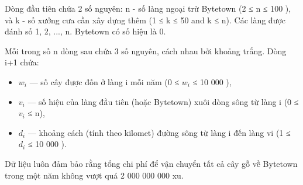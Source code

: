 Dòng đầu tiên chứa 2 số nguyên: n - số làng ngoại trừ Bytetown (2 ≤ n ≤ 100 ), và k - số xưởng cưa cần xây dựng thêm (1 ≤ k ≤ 50 and k ≤ n). Các làng được đánh số 1, 2, ..., n. Bytetown có số hiệu là 0.  

   Mỗi trong số n dòng sau chứa 3 số nguyên, cách nhau bởi khoảng trắng. Dòng i+1 chứa:  
\begin{itemize}
	\item     $w_{i}$    — số cây được đốn ở làng i mỗi năm (0 ≤ $w_{i}$    ≤ 10 000 ),   
	\item     $v_{i}$    — số hiệu của làng đầu tiên (hoặc Bytetown) xuôi dòng sông từ làng i (0 ≤ $v_{i}$    ≤ n),   
	\item     $d_{i}$    — khoảng cách (tính theo kilomet) đường sông từ làng i đến làng vi (1 ≤ $d_{i}$    ≤ 10 000 ).   
\end{itemize}

   Dữ liệu luôn đảm bảo rằng tổng chi phí để vận chuyển tất cả cây gỗ về Bytetown trong một năm không vượt quá 2 000 000 000 xu.